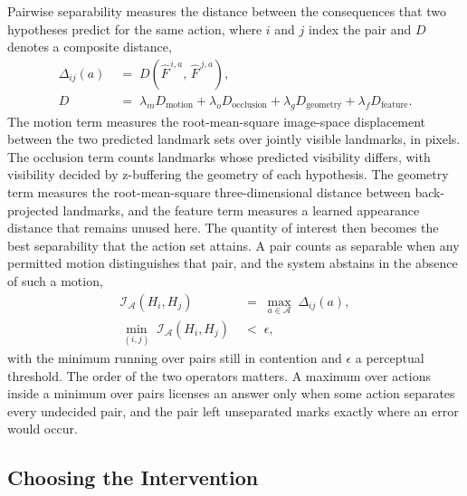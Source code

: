 \documentclass{article} %
\theoremstyle{defstyle}
\theoremstyle{plain}
\begin{document}
Pairwise separability measures the distance between the consequences that two hypotheses
predict for the same action, where $i$ and $j$ index the pair and $D$ denotes a composite
distance,
\begin{align}
\label{eq:separability}
\Delta_{ij}(a) \;&=\; D\!\left(\hat{F}^{\,i,a},\, \hat{F}^{\,j,a}\right), \\
\label{eq:distance}
D \;&=\; \lambda_m D_{\text{motion}} + \lambda_o D_{\text{occlusion}}
+ \lambda_g D_{\text{geometry}} + \lambda_f D_{\text{feature}} .
\end{align}
The motion term measures the root-mean-square image-space displacement between the two
predicted landmark sets over jointly visible landmarks, in pixels. The occlusion term counts
landmarks whose predicted visibility differs, with visibility decided by z-buffering the
geometry of each hypothesis. The geometry term measures the root-mean-square three-dimensional
distance between back-projected landmarks, and the feature term measures a learned appearance
distance that remains unused here. The quantity of interest then becomes the best separability
that the action set attains. A pair counts as separable when any permitted motion distinguishes
that pair, and the system abstains in the absence of such a motion,
\begin{align}
\label{eq:identifiability}
\mathcal{I}_{\mathcal{A}}\!\left(H_i, H_j\right)
\;&=\; \max_{a \in \mathcal{A}} \; \Delta_{ij}(a), \\
\label{eq:abstain}
\min_{(i,j)} \; \mathcal{I}_{\mathcal{A}}\!\left(H_i, H_j\right) \;&<\; \epsilon ,
\end{align}
with the minimum running over pairs still in contention and $\epsilon$ a perceptual threshold.
The order of the two operators matters. A maximum over actions inside a minimum over pairs
licenses an answer only when some action separates every undecided pair, and the pair left
unseparated marks exactly where an error would occur.

\subsection{Choosing the Intervention}
\label{sec:selection}
\end{document}
